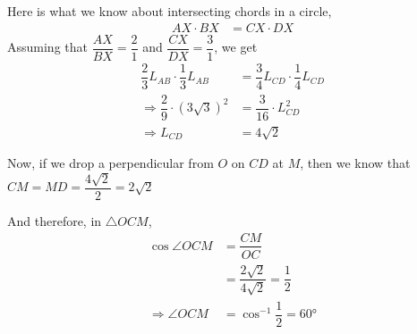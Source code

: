 \ifprintanswers
\fi 

\begin{solution}[\fullpage]
	Here is what we know about intersecting chords in a circle,
	\begin{align}
		AX\cdot BX &= CX\cdot DX
	\end{align}
	Assuming that $\dfrac{AX}{BX} = \dfrac{2}{1}$ and $\dfrac{CX}{DX} = \dfrac{3}{1}$, we get
	\begin{align}
		\dfrac{2}{3}L_{AB}\cdot\dfrac{1}{3}L_{AB} &= \dfrac{3}{4}L_{CD}\cdot\dfrac{1}{4}L_{CD} \\
		\Rightarrow \dfrac{2}{9}\cdot(3\sqrt{3})^2 &= \dfrac{3}{16}\cdot L_{CD}^2 \\
		\Rightarrow L_{CD} &= 4\sqrt{2}
	\end{align}
	
	Now, if we drop a perpendicular from $O$ on $CD$ at $M$, then we know that 
	$CM = MD = \dfrac{4\sqrt2}{2} = 2\sqrt{2}$
	
	And therefore, in $\triangle OCM$, 
	\begin{align}
		\cos\angle OCM &= \dfrac{CM}{OC} \\
		               &= \dfrac{2\sqrt{2}}{4\sqrt{2}} = \dfrac{1}{2} \\
		\Rightarrow \angle OCM &= \cos^{-1}\dfrac{1}{2} = \ang{60}
	\end{align}
\end{solution}
